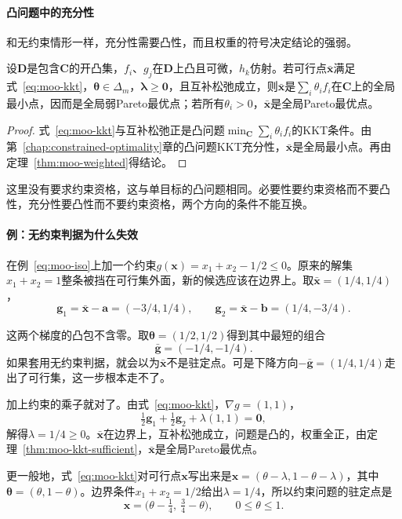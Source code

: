 \paragraph{凸问题中的充分性}
和无约束情形一样，充分性需要凸性，而且权重的符号决定结论的强弱。

\begin{theorem}[凸问题的多目标KKT充分性]
\label{thm:moo-kkt-sufficient}
设$\bm{D}$是包含$\bm{C}$的开凸集，$f_i$、$g_j$在$\bm{D}$上凸且可微，$h_k$仿射。若可行点$\bar{\bm{x}}$满足式~\eqref{eq:moo-kkt}，$\bm{\theta}\in\Delta_m$，$\bm{\lambda}\geq\bm{0}$，且互补松弛成立，则$\bar{\bm{x}}$是$\sum_i\theta_if_i$在$\bm{C}$上的全局最小点，因而是全局弱Pareto最优点；若所有$\theta_i>0$，$\bar{\bm{x}}$是全局Pareto最优点。
\end{theorem}

\begin{proof}
式~\eqref{eq:moo-kkt}与互补松弛正是凸问题$\min_{\bm{C}}\sum_i\theta_if_i$的KKT条件。由第~\ref{chap:constrained-optimality}章的凸问题KKT充分性，$\bar{\bm{x}}$是全局最小点。再由定理~\ref{thm:moo-weighted}得结论。
\end{proof}

这里没有要求约束资格，这与单目标的凸问题相同。必要性要约束资格而不要凸性，充分性要凸性而不要约束资格，两个方向的条件不能互换。

\paragraph{例：无约束判据为什么失效}
在例~\eqref{eq:moo-iso}上加一个约束$g(\bm{x})=x_1+x_2-1/2\leq0$。原来的解集$x_1+x_2=1$整条被挡在可行集外面，新的候选应该在边界上。取$\bar{\bm{x}}=(1/4,1/4)$，
\[
 \bm{g}_1=\bar{\bm{x}}-\bm{a}=(-3/4,1/4),\qquad\bm{g}_2=\bar{\bm{x}}-\bm{b}=(1/4,-3/4).
\]

这两个梯度的凸包不含零。取$\bm{\theta}=(1/2,1/2)$得到其中最短的组合
\[
 \bar{\bm{g}}=(-1/4,-1/4).
\]
如果套用无约束判据，就会以为$\bar{\bm{x}}$不是驻定点。可是下降方向$-\bar{\bm{g}}=(1/4,1/4)$走出了可行集，这一步根本走不了。

加上约束的乘子就对了。由式~\eqref{eq:moo-kkt}，$\nabla g=(1,1)$，
\[
 \tfrac12\bm{g}_1+\tfrac12\bm{g}_2+\lambda(1,1)=\bm{0},
\]
解得$\lambda=1/4\geq0$。$\bar{\bm{x}}$在边界上，互补松弛成立，问题是凸的，权重全正，由定理~\ref{thm:moo-kkt-sufficient}，$\bar{\bm{x}}$是全局Pareto最优点。

更一般地，式~\eqref{eq:moo-kkt}对可行点$\bm{x}$写出来是$\bm{x}=(\theta-\lambda,1-\theta-\lambda)$，其中$\bm{\theta}=(\theta,1-\theta)$。边界条件$x_1+x_2=1/2$给出$\lambda=1/4$，所以约束问题的驻定点是
\begin{equation}
 \bm{x}=\bigl(\theta-\tfrac14,\ \tfrac34-\theta\bigr),\qquad 0\leq\theta\leq1.
 \label{eq:moo-feasible-set}
\end{equation}

